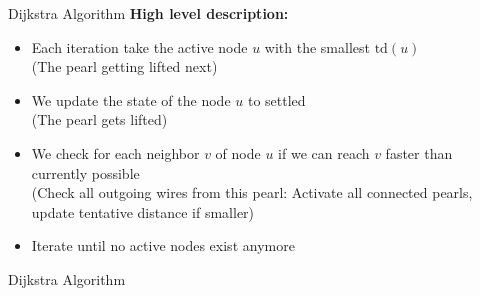 \begin{frame}{Dijkstra Algorithm}
  \textbf{High level description:}
  \begin{itemize}
    \item
      Each iteration take the {\color{Mittel-Blau}active} node
      {\color{Mittel-Blau}$u$} with the
      {\color{Mittel-Blau}smallest $\mathrm{td}(u)$}\\
      {\color{gray}(The pearl getting lifted next)}
    \item
      We update the state of the node {\color{Mittel-Blau}$u$} to
      {\color{Mittel-Blau}settled}\\
      {\color{gray}(The pearl gets lifted)}
    \item
      We check for each {\color{Mittel-Blau}neighbor $v$} of node
      {\color{Mittel-Blau}$u$} if we can reach {\color{Mittel-Blau}$v$} faster
      than currently possible\\
      {\color{gray}(Check all outgoing wires from this pearl:
        Activate all connected pearls, update
        tentative distance if smaller)}
    \item
      Iterate until no active nodes exist anymore
  \end{itemize}
\end{frame}


\begin{frame}{Dijkstra Algorithm}
  \vspace{-1em}
  \begin{figure}[!h]
    \begin{adjustbox}{width=\linewidth}
      \def\DijkstraReverse{0}%
      
    \end{adjustbox}
    \vspace{-2em}
    \caption{%
    }
  \end{figure}
\end{frame}



